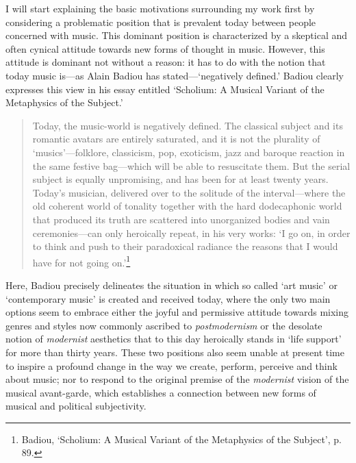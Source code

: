 I will start explaining the basic motivations surrounding my work first by considering a problematic position that is prevalent today between people concerned with music. This dominant position is characterized by a skeptical and often cynical attitude towards new forms of thought in music. However, this attitude is dominant not without a reason: it has to do with the notion that today music is---as Alain Badiou has stated---`negatively defined.' Badiou clearly expresses this view in his essay entitled `Scholium: A Musical Variant of the Metaphysics of the Subject.'
\begin{quote}
Today, the music-world is negatively defined. The classical subject and its romantic avatars are entirely saturated, and it is not the plurality of `musics'---folklore, classicism, pop, exoticism, jazz and baroque reaction in the same festive bag---which will be able to resuscitate them. But the serial subject is equally unpromising, and has been for at least twenty years. Today's  musician, delivered over to the solitude of the interval---where the old coherent world of tonality together with the hard dodecaphonic world that produced its truth are scattered into unorganized bodies and vain ceremonies---can only heroically repeat, in his very works: `I go on, in order to think and push to their paradoxical radiance the reasons that I would have for not going on.'\footnote{Badiou,  `Scholium: A Musical Variant of the Metaphysics of the Subject', p. 89.} 
\end{quote}
Here, Badiou precisely delineates the situation in which so called `art music' or `contemporary music' is created and received today, where the only two main options seem to embrace either the joyful and permissive attitude towards mixing genres and styles now commonly ascribed to \emph{postmodernism} or the desolate notion of \emph{modernist} aesthetics that to this day heroically stands in `life support' for more than thirty years. These two positions also seem unable at present time to inspire a profound change in the way we create, perform, perceive and think about music; nor to respond to the original premise of the \emph{modernist} vision of the musical avant-garde, which establishes a connection between new forms of musical and political subjectivity. 

